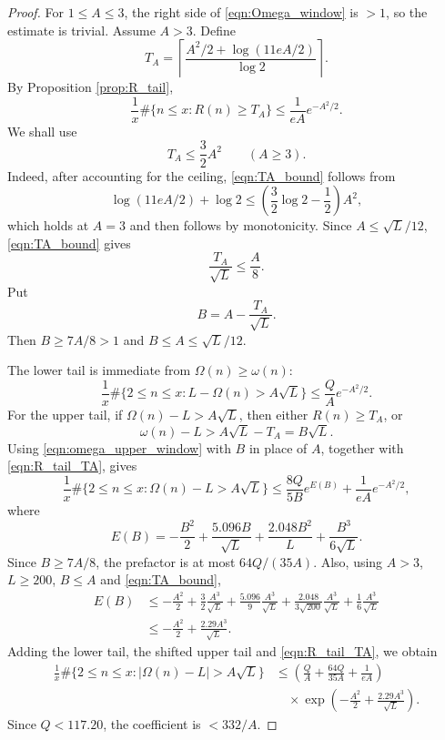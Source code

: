 \documentclass[10pt,a4paper]{amsart}
\begin{document}
\begin{proof}
    For $1\le A\le 3$, the right side of \eqref{eqn:Omega_window} is $>1$, so the estimate is trivial. Assume $A>3$. Define
    $$T_A=\left\lceil\frac{A^2/2+\log(11eA/2)}{\log 2}\right\rceil.$$
    By Proposition \ref{prop:R_tail},
    \begin{equation}\label{eqn:R_tail_TA}
        \frac{1}{x}\#\{n\le x:R(n)\ge T_A\}\le\frac{1}{eA}e^{-A^2/2}.
    \end{equation}
    We shall use
    \begin{equation}\label{eqn:TA_bound}
        T_A\le\frac{3}{2}A^2\qquad (A\ge 3).
    \end{equation}
    Indeed, after accounting for the ceiling, \eqref{eqn:TA_bound} follows from
    $$\log(11eA/2)+\log 2\le\left(\frac{3}{2}\log 2-\frac{1}{2}\right)A^2,$$
    which holds at $A=3$ and then follows by monotonicity. Since $A\le\sqrt{L}/12$, \eqref{eqn:TA_bound} gives
    $$\frac{T_A}{\sqrt{L}}\le\frac{A}{8}.$$
    Put
    $$B=A-\frac{T_A}{\sqrt{L}}.$$
    Then $B\ge 7A/8>1$ and $B\le A\le\sqrt{L}/12$.

    The lower tail is immediate from $\Omega(n)\ge\omega(n)$:
    $$\frac{1}{x}\#\{2\le n\le x:L-\Omega(n)>A\sqrt{L}\}\le\frac{Q}{A}e^{-A^2/2}.$$
    For the upper tail, if $\Omega(n)-L>A\sqrt{L}$, then either $R(n)\ge T_A$, or
    $$\omega(n)-L>A\sqrt{L}-T_A=B\sqrt{L}.$$
    Using \eqref{eqn:omega_upper_window} with $B$ in place of $A$, together with \eqref{eqn:R_tail_TA}, gives
    $$\frac{1}{x}\#\{2\le n\le x:\Omega(n)-L>A\sqrt{L}\}\le\frac{8Q}{5B}e^{E(B)}+\frac{1}{eA}e^{-A^2/2},$$
    where
    $$E(B)=-\frac{B^2}{2}+\frac{5.096B}{\sqrt{L}}+\frac{2.048B^2}{L}+\frac{B^3}{6\sqrt{L}}.$$
    Since $B\ge 7A/8$, the prefactor is at most $64Q/(35A)$. Also, using $A>3$, $L\ge 200$, $B\le A$ and \eqref{eqn:TA_bound},
    \begin{align*}
        E(B)&\le -\frac{A^2}{2}+\frac{3}{2}\frac{A^3}{\sqrt{L}}+\frac{5.096}{9}\frac{A^3}{\sqrt{L}}+\frac{2.048}{3\sqrt{200}}\frac{A^3}{\sqrt{L}}+\frac{1}{6}\frac{A^3}{\sqrt{L}}\\
        &\le -\frac{A^2}{2}+\frac{2.29A^3}{\sqrt{L}}.
    \end{align*}
    Adding the lower tail, the shifted upper tail and \eqref{eqn:R_tail_TA}, we obtain
    \begin{align*}
        \frac{1}{x}\#\{2\le n\le x:|\Omega(n)-L|>A\sqrt{L}\}&\le\left(\frac{Q}{A}+\frac{64Q}{35A}+\frac{1}{eA}\right)\\
        &\quad\times\exp\left(-\frac{A^2}{2}+\frac{2.29A^3}{\sqrt{L}}\right).
    \end{align*}
    Since $Q<117.20$, the coefficient is $<332/A$.
\end{proof}
\end{document}
